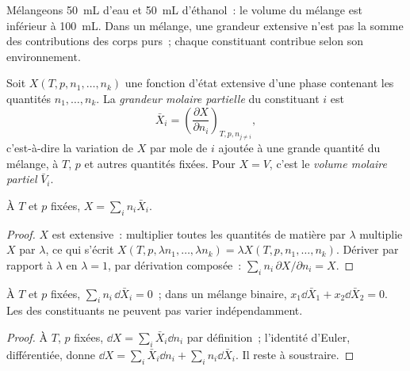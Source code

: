 Mélangeons \qty{50}{mL} d'eau et \qty{50}{mL} d'éthanol~: le volume du
mélange est inférieur à \qty{100}{mL}. Dans un mélange, une grandeur extensive n'est
pas la somme des contributions des corps purs~; chaque constituant
contribue selon son environnement.

\begin{definition}\label{def:b2:chemical-potential:partial-molar}
Soit $X(T, p, n_1, \dots, n_k)$ une fonction d'état extensive d'une phase
contenant les quantités $n_1, \dots, n_k$. La \emph{grandeur molaire
partielle} du constituant $i$ est
\[
  \bar X_i = \left(\frac{\partial X}{\partial n_i}\right)_{T, p, n_{j \ne i}} ,
\]
c'est-à-dire la variation de $X$ par mole de $i$ ajoutée à une grande quantité du mélange,
à $T$, $p$ et autres quantités fixées. Pour $X = V$, c'est le \emph{volume molaire
partiel} $\bar V_i$.
\end{definition}

\begin{theorem}\label{thm:b2:chemical-potential:euler}
À $T$ et $p$ fixées, $X = \sum_i n_i\bar X_i$.
\end{theorem}

\begin{proof}
$X$ est extensive~: multiplier toutes les quantités de matière par $\lambda$ multiplie
$X$ par $\lambda$, ce qui s'écrit $X(T, p, \lambda n_1, \dots, \lambda n_k) = \lambda X(T, p, n_1,
\dots, n_k)$. Dériver par rapport à $\lambda$ en $\lambda = 1$, par
dérivation composée~: $\sum_i n_i\,\partial X/\partial n_i = X$.
\end{proof}

\begin{proposition}\label{prop:b2:chemical-potential:gibbs-duhem}
À $T$ et $p$ fixées, $\sum_i n_i\,\dd\bar X_i = 0$~; dans un mélange binaire,
$x_1\dd\bar X_1 + x_2\dd\bar X_2 = 0$. Les  des
constituants ne peuvent pas varier indépendamment.
\end{proposition}

\begin{proof}
À $T$, $p$ fixées, $\dd X = \sum_i\bar X_i\dd n_i$ par définition~; l'identité
d'Euler, différentiée, donne $\dd X = \sum_i\bar X_i\dd n_i + \sum_i
n_i\dd\bar X_i$. Il reste à soustraire.
\end{proof}

